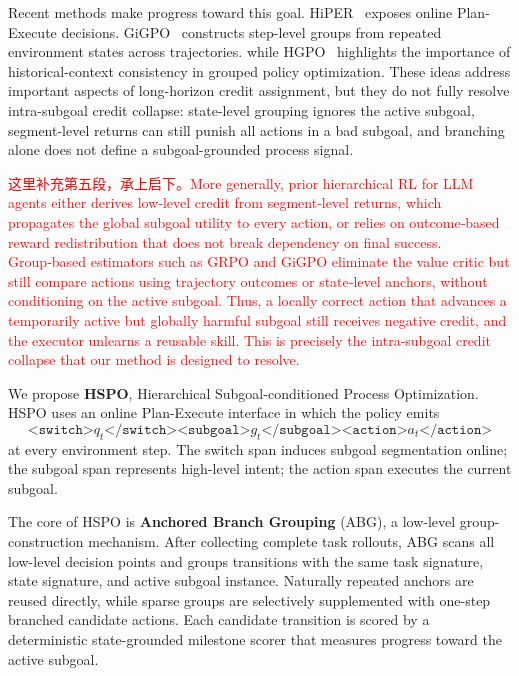 \documentclass{article}
\newcommand{\wei}[1]{\textcolor{red}{#1}}
\begin{document}
Recent methods make progress toward this goal. HiPER~\cite{hiper} exposes online Plan-Execute decisions. GiGPO~\cite{gigpo} constructs step-level groups from repeated environment states across trajectories. while HGPO~\cite{hgpo} highlights the importance of historical-context consistency in grouped policy optimization. These ideas address important aspects of long-horizon credit assignment, but they do not fully resolve intra-subgoal credit collapse: state-level grouping ignores the active subgoal, segment-level returns can still punish all actions in a bad subgoal, and branching alone does not define a subgoal-grounded process signal.

\wei{这里补充第五段，承上启下。More generally, prior hierarchical RL for LLM agents either derives low‑level credit from segment‑level returns, which propagates the global subgoal utility to every action, or relies on outcome‑based reward redistribution that does not break dependency on final success. Group‑based estimators such as GRPO \cite{} and GiGPO eliminate the value critic but still compare actions using trajectory outcomes or state‑level anchors, without conditioning on the active subgoal. Thus, a locally correct action that advances a temporarily active but globally harmful subgoal still receives negative credit, and the executor unlearns a reusable skill. This is precisely the intra‑subgoal credit collapse that our method is designed to resolve.}



We propose \textbf{HSPO}, Hierarchical Subgoal-conditioned Process Optimization. HSPO uses an online Plan-Execute interface in which the policy emits
\[
\texttt{<switch>}q_t\texttt{</switch>}
\texttt{<subgoal>}g_t\texttt{</subgoal>}
\texttt{<action>}a_t\texttt{</action>}
\]
at every environment step. The switch span induces subgoal segmentation online; the subgoal span represents high-level intent; the action span executes the current subgoal. 

The core of HSPO is \textbf{Anchored Branch Grouping} (ABG), a low-level group-construction mechanism. After collecting complete task rollouts, ABG scans all low-level decision points and groups transitions with the same task signature, state signature, and active subgoal instance. Naturally repeated anchors are reused directly, while sparse groups are selectively supplemented with one-step branched candidate actions. Each candidate transition is scored by a deterministic state-grounded milestone scorer that measures progress toward the active subgoal.
\end{document}
